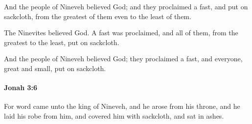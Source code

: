 			\begin{versebox}
					\item[BHS] 
					\item[LXX] 
					\item[ASV] And the people of Nineveh believed God; and they proclaimed a fast, and put on sackcloth, from the greatest of them even to the least of them.
					\item[NIV] The Ninevites believed God. A fast was proclaimed, and all of them, from the greatest to the least, put on sackcloth.
					\item[NRSV] And the people of Nineveh believed God; they proclaimed a fast, and everyone, great and small, put on sackcloth.
			\end{versebox}

		\paragraph{Jonah 3:6} %
			\label{JONAH-3-6}

			For word came unto the king of Nineveh, and he arose from his throne, and he laid his robe from him, and covered him with sackcloth, and sat in ashes.

